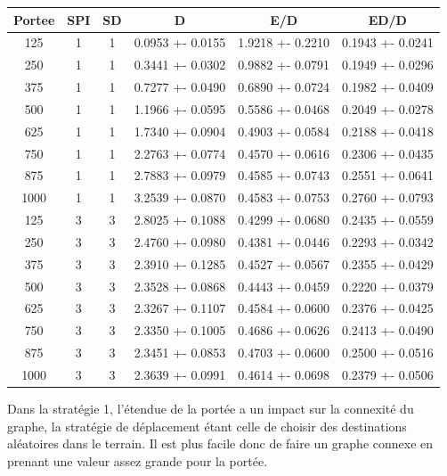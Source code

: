 \documentclass[a4paper]{article}
\begin{document}
\begin{center}
\begin{tabular}{|c|c|c|c|c|c|}
  \hline
Portee & SPI & SD & D & E/D & ED/D \\\hline
125 & 1 & 1 & 0.0953 +- 0.0155 & 1.9218 +- 0.2210 & 0.1943 +- 0.0241 \\\hline
250 & 1 & 1 & 0.3441 +- 0.0302 & 0.9882 +- 0.0791 & 0.1949 +- 0.0296 \\\hline
375 & 1 & 1 & 0.7277 +- 0.0490 & 0.6890 +- 0.0724 & 0.1982 +- 0.0409 \\\hline
500 & 1 & 1 & 1.1966 +- 0.0595 & 0.5586 +- 0.0468 & 0.2049 +- 0.0278 \\\hline
625 & 1 & 1 & 1.7340 +- 0.0904 & 0.4903 +- 0.0584 & 0.2188 +- 0.0418 \\\hline
750 & 1 & 1 & 2.2763 +- 0.0774 & 0.4570 +- 0.0616 & 0.2306 +- 0.0435 \\\hline
875 & 1 & 1 & 2.7883 +- 0.0979 & 0.4585 +- 0.0743 & 0.2551 +- 0.0641 \\\hline
1000 & 1 & 1 & 3.2539 +- 0.0870 & 0.4583 +- 0.0753 & 0.2760 +- 0.0793 \\\hline
125 & 3 & 3 & 2.8025 +- 0.1088 & 0.4299 +- 0.0680 & 0.2435 +- 0.0559 \\\hline
250 & 3 & 3 & 2.4760 +- 0.0980 & 0.4381 +- 0.0446 & 0.2293 +- 0.0342 \\\hline
375 & 3 & 3 & 2.3910 +- 0.1285 & 0.4527 +- 0.0567 & 0.2355 +- 0.0429 \\\hline
500 & 3 & 3 & 2.3528 +- 0.0868 & 0.4443 +- 0.0459 & 0.2220 +- 0.0379 \\\hline
625 & 3 & 3 & 2.3267 +- 0.1107 & 0.4584 +- 0.0600 & 0.2376 +- 0.0425 \\\hline
750 & 3 & 3 & 2.3350 +- 0.1005 & 0.4686 +- 0.0626 & 0.2413 +- 0.0490 \\\hline
875 & 3 & 3 & 2.3451 +- 0.0853 & 0.4703 +- 0.0600 & 0.2500 +- 0.0516 \\\hline
1000 & 3 & 3 & 2.3639 +- 0.0991 & 0.4614 +- 0.0698 & 0.2379 +- 0.0506 \\\hline
\end{tabular}
\end{center}
Dans la stratégie 1, l'étendue de la portée a un impact sur la
connexité du graphe, la stratégie de déplacement étant celle de
choisir des destinations aléatoires dans le terrain. Il est plus
facile donc de faire un graphe connexe en prenant une valeur assez
grande pour la portée.
\end{document}
